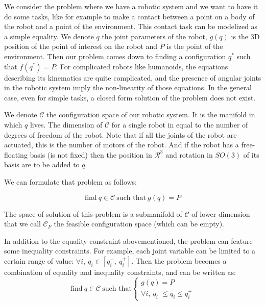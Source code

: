 We consider the problem where we have a robotic system and we want to have it do some tasks, like for example to make a contact between a point on a body of the robot and a point of the environment.
This contact task can be modelized as a simple equality.
We denote $q$ the joint parameters of the robot, $g(q)$ is the 3D position of the point of interest on the robot and $P$ is the point of the environment.
Then our problem comes down to finding a configuration $q^*$ such that $f(q^*) = P$.
For complicated robots like humanoids, the equations describing its kinematics are quite complicated, and the presence of angular joints in the robotic system imply the non-linearity of those equations.
In the general case, even for simple tasks, a closed form solution of the problem does not exist.

We denote $\mathcal{C}$ the configuration space of our robotic system. It is the manifold in which $q$ lives. The dimension of $\mathcal{C}$ for a single robot in equal to the number of degrees of freedom of the robot. Note that if all the joints of the robot are actuated, this is the number of motors of the robot. And if the robot has a free-floating basis (is not fixed) then the position in $\mathcal{R}^3$ and rotation in $SO(3)$ of its basis are to be added to $q$.

We can formulate that problem as follows:

\begin{equation}
  \text{find}\ q\in\mathcal{C}\ \text{such that}\ g(q)=P
\end{equation}

The space of solution of this problem is a submanifold of $\mathcal{C}$ of lower dimension that we call ${\mathcal{C}}_F$ the feasible configuration space (which can be empty).

In addition to the equality constraint abovementioned, the problem can feature some inequality constraints.
For example, each joint variable can be limited to a certain range of value: $\forall i,\ q_i\in [q_i^-,\ q_i^+]$. Then the problem becomes a combination of equality and inequality constraints, and can be written as:
\begin{equation}
  \text{find}\ q\in\mathcal{C}\ \text{such that}\left\{
  \begin{array}{l}
    g(q)=P \\
    \forall i,\ q_i^- \leq q_i \leq q_i^+
  \end{array}
  \right.
\end{equation}

